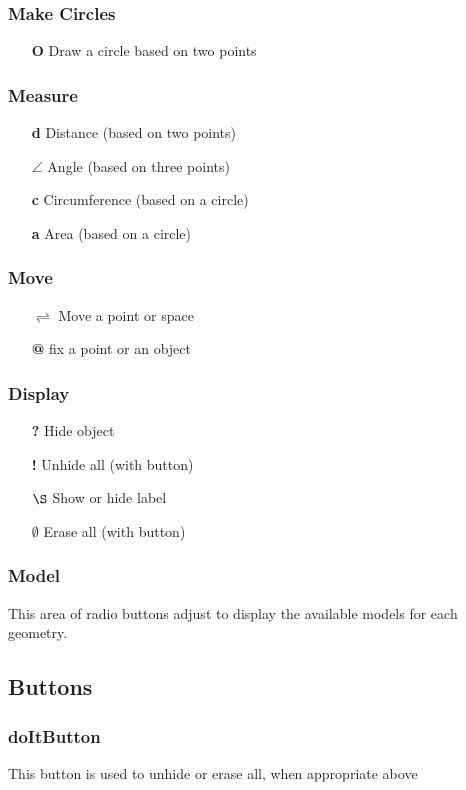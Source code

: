 \documentclass[a4paper,10pt]{report}
\begin{document}
\subsubsection{Make Circles}
\begin{enumerate}
 \item[\bf O] Draw a circle based on two points
\end{enumerate}
\subsubsection{Measure}
\begin{enumerate}
 \item[\bf d] Distance (based on two points)
 \item[\bf $\angle$] Angle (based on three points)
 \item[\bf c] Circumference (based on a circle)
 \item[\bf a] Area (based on a circle)
\end{enumerate}
\subsubsection{Move}
\begin{enumerate}
 \item[\bf $\rightleftharpoons$] Move a point or space
 \item[\bf @] fix a point or an object
\end{enumerate}
\subsubsection{Display}
\begin{enumerate}
 \item[\bf ?] Hide object
 \item[\bf !] Unhide all (with button)
 \item[\bf $\S$] Show or hide label
 \item[\bf $\emptyset$] Erase all (with button)
\end{enumerate}
\subsubsection{Model}
This area of radio buttons adjust to display the available models for each geometry.
\subsection{Buttons}
\subsubsection{doItButton}
This button is used to unhide or erase all, when appropriate above
\end{document}
